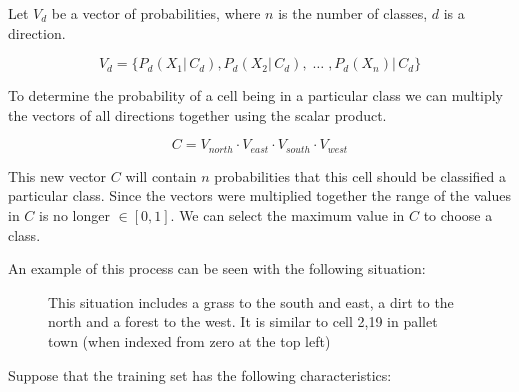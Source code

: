 \documentclass[preprint,5p,times,twocolumn]{elsarticle}
\begin{document}
Let $V_{d}$ be a vector of probabilities, where $n$ is the number of classes,
$d$ is a direction.

\begin{equation}
V_{d} = \{P_{d}{(X_{1} | \, C_{d})}, P_{d}{(X_{2} | \, C_{d}),\; \ldots \; , P_{d}{(X_{n}) | \, C_{d}}}\}
\end{equation}

 To determine the probability of a cell being in a particular class
we can multiply the vectors of all directions together using the scalar
product.

\begin{equation}
C = V_{north} \cdot V_{east} \cdot V_{south} \cdot V_{west}
\end{equation}

This new vector $C$ will contain $n$ probabilities that this cell should be
classified a particular class. Since the vectors were multiplied together the
range of the values in $C$ is no longer $\in[0,1]$. We can select the maximum
value in $C$ to choose a class.

An example of this process can be seen with the following situation:

\begin{figure}[h]
\begin{center}
\end{center}

\caption{This situation includes a grass to the south and east, a dirt to the
    north and a forest to the west. It is similar to cell 2,19 in pallet town
    (when indexed from zero at the top left)}

\end{figure}

Suppose that the training set has the following characteristics:
\end{document}
